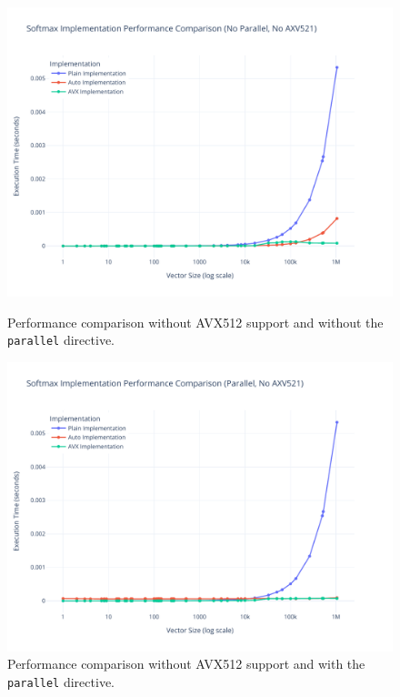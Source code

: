 \documentclass[10pt]{article}
\begin{document}
\begin{figure}[h!]
  \centering
  \begin{minipage}{0.49\textwidth}
    \centering
    \includegraphics[width=\linewidth]{../images/softmax_noparallel_noaxv521.pdf}
    \caption{Performance comparison without AVX512 support and without the \texttt{parallel} directive.}
    \label{fig:softmax_auto_no_avx512}
  \end{minipage}%
  \hfill
  \begin{minipage}{0.49\textwidth}
    \centering
    \includegraphics[width=\linewidth]{../images/softmax_parallel_noaxv521.pdf}
    \caption{Performance comparison without AVX512 support and with the \texttt{parallel} directive.}
    \label{fig:softmax_auto_no_avx512_parallel}
  \end{minipage}
\end{figure}
\end{document}
